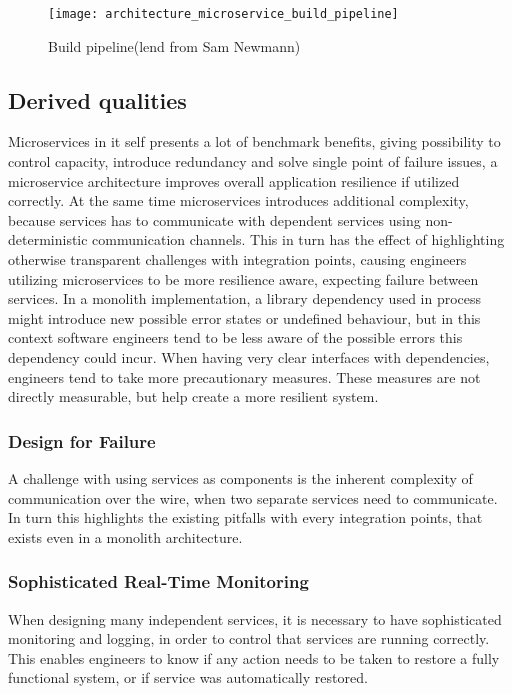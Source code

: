 \begin{figure}[!htb]
  \texttt{[image: architecture\_microservice\_build\_pipeline]}  
  \caption{Build pipeline(lend from Sam Newmann)}
  \label{fig:architecture_microservice_build_pipeline}
\end{figure}


\subsection{Derived qualities}
Microservices in it self presents a lot of benchmark benefits, giving possibility to control capacity, introduce redundancy and solve single point of failure issues, a microservice architecture improves overall application resilience if utilized correctly. At the same time microservices introduces additional complexity, because services has to communicate with dependent services using non-deterministic communication channels. This in turn has the effect of highlighting otherwise transparent challenges with integration points, causing engineers utilizing microservices to be more resilience aware, expecting failure between services. In a monolith implementation, a library dependency used in process might introduce new possible error states or undefined behaviour, but in this context software engineers tend to be less aware of the possible errors this dependency could incur. When having very clear interfaces with dependencies, engineers tend to take more precautionary measures. These measures are not directly measurable, but help create a more resilient system. 

\subsubsection*{Design for Failure}
A challenge with using services as components is the inherent complexity of communication over the wire, when two separate services need to communicate. In turn this highlights the existing pitfalls with every integration points, that exists even in a monolith architecture.

\subsubsection*{Sophisticated Real-Time Monitoring}
When designing many independent services, it is necessary to have sophisticated monitoring and logging, in order to control that services are running correctly. This enables engineers to know if any action needs to be taken to restore a fully functional system, or if service was automatically restored.


